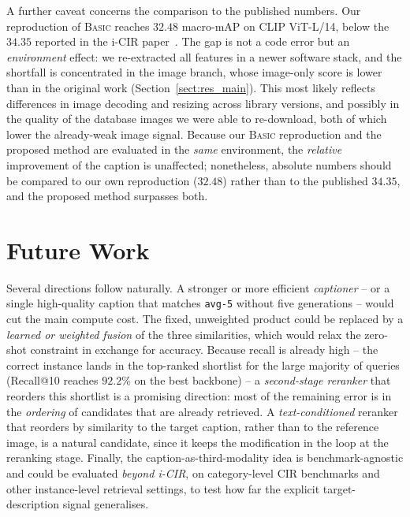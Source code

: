 A further caveat concerns the comparison to the published numbers. Our
reproduction of \textsc{Basic} reaches $32.48$ macro-mAP on CLIP ViT-L/14, below
the $34.35$ reported in the i-CIR paper~\cite{psomas2025icir}. The gap is not a
code error but an \emph{environment} effect: we re-extracted all features in a
newer software stack, and the shortfall is concentrated in the image branch,
whose image-only score is lower than in the original work
(Section~\ref{sect:res_main}). This most likely reflects differences in
image decoding and resizing across library versions, and possibly in the quality
of the database images we were able to re-download, both of which lower the
already-weak image signal. Because our \textsc{Basic} reproduction and the
proposed method are evaluated in the \emph{same} environment, the \emph{relative}
improvement of the caption is unaffected; nonetheless, absolute numbers should be
compared to our own reproduction ($32.48$) rather than to the published $34.35$,
and the proposed method surpasses both.

\section{Future Work}\label{sect:concl_future}

Several directions follow naturally. A stronger or more efficient
\emph{captioner} -- or a single high-quality caption that matches \texttt{avg-5}
without five generations -- would cut the main compute cost. The fixed,
unweighted product could be replaced by a \emph{learned or weighted fusion} of
the three similarities, which would relax the zero-shot constraint in exchange
for accuracy. Because recall is already high -- the correct instance lands in the
top-ranked shortlist for the large majority of queries (Recall@10 reaches
$92.2\%$ on the best backbone) -- a \emph{second-stage reranker} that reorders
this shortlist is a promising direction: most of the remaining error is in the
\emph{ordering} of candidates that are already retrieved. A
\emph{text-conditioned} reranker that reorders by similarity to the target
caption, rather than to the reference image, is a natural candidate, since it
keeps the modification in the loop at the reranking stage. Finally, the
caption-as-third-modality idea is benchmark-agnostic and could be evaluated
\emph{beyond i-CIR}, on category-level CIR benchmarks and other instance-level
retrieval settings, to test how far the explicit target-description signal
generalises.
